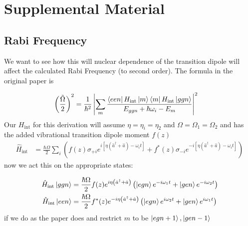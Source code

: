 \section{Supplemental Material}

\subsection{Rabi Frequency}

We want to see how this will nuclear dependence of the transition dipole will affect the calculated Rabi Frequency (to second order).  The formula in the original paper is

\begin{align*}
	\left(  \frac{\tilde{\Omega}}{2} \right)^2 &= \frac{1}{\hbar^2} \left|  \sum_m  \frac{\bra{een}H_{\text{int}}  \ket{m}\bra{m} H_{\text{int}} \ket{ggn} }{E_{ggn} + \hbar \omega_i - E_m} \right|^2
\end{align*}
Our $H_{\text{int}}$ for this derivation will assume $\eta = \eta_i = \eta_2$ and $\Omega = \Omega_1 = \Omega_2$ and has the added vibrational transition dipole moment $f(z)$
\begin{align*}
	\hat{H}_{\text{int}} &= \frac{\hbar \Omega}{2} \sum_{i}  \left( f(z) \sigma_{+i} e^{i \left[ \eta\left( \hat{a}^{\dagger} + \hat{a} \right) - \omega_i t \right]}  + f^*(z) \sigma_{-i} e^{-i \left[ \eta \left( \hat{a}^{\dagger} + \hat{a} \right) - \omega_i t \right]} \right)
\end{align*}
now we act this on the appropriate states:

\begin{align*}
	\hat{H}_{\text{int}} \ket{ggn} &= \frac{\hbar \Omega}{2}f(z) e^{i \eta\left( \hat{a}^{\dagger} + \hat{a} \right) } \left(  \ket{egn}e^{- i\omega_1 t } + \ket{gen}e^{- i\omega_2 t }   \right) \\
	\hat{H}_{\text{int}} \ket{een} &= \frac{\hbar \Omega}{2}f^*(z) e^{-i \eta\left( \hat{a}^{\dagger} + \hat{a} \right) } \left(  \ket{egn}e^{ i\omega_2 t } + \ket{gen}e^{i\omega_1 t }   \right)
\end{align*}
if we do as the paper does and restrict $m$ to be $\ket{egn+1}, \ket{gen-1}$


